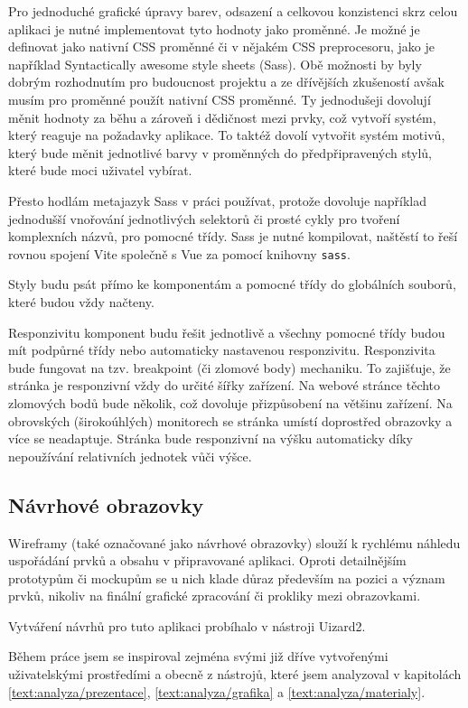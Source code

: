 Pro jednoduché grafické úpravy barev, odsazení a celkovou konzistenci skrz celou aplikaci je nutné implementovat tyto hodnoty jako proměnné.
Je možné je definovat jako nativní CSS proměnné či v nějakém CSS preprocesoru, jako je například Syntactically awesome style sheets (Sass).
Obě možnosti by byly dobrým rozhodnutím pro budoucnost projektu a ze dřívějších zkušeností avšak musím pro proměnné použít nativní CSS proměnné.
Ty jednodušeji dovolují měnit hodnoty za běhu a zároveň i dědičnost mezi prvky, což vytvoří systém, který reaguje na požadavky aplikace.
To taktéž dovolí vytvořit systém motivů, který bude měnit jednotlivé barvy v proměnných do předpřipravených stylů, které bude moci uživatel vybírat.

Přesto hodlám metajazyk Sass v práci používat, protože dovoluje například jednodušší vnořování jednotlivých selektorů či prosté cykly pro tvoření komplexních názvů, pro pomocné třídy.
Sass je nutné kompilovat, naštěstí to řeší rovnou spojení Vite společně s Vue za pomocí knihovny \texttt{sass}.

Styly budu psát přímo ke komponentám a pomocné třídy do globálních souborů, které budou vždy načteny.

Responzivitu komponent budu řešit jednotlivě a všechny pomocné třídy budou mít podpůrné třídy nebo automaticky nastavenou responzivitu.
Responzivita bude fungovat na tzv. breakpoint (či zlomové body) mechaniku.
To zajišťuje, že stránka je responzivní vždy do určité šířky zařízení.
Na webové stránce těchto zlomových bodů bude několik, což dovoluje přizpůsobení na většinu zařízení.
Na obrovských (širokoúhlých) monitorech se stránka umístí doprostřed obrazovky a více se neadaptuje.
Stránka bude responzivní na výšku automaticky díky nepoužívání relativních jednotek vůči výšce.

\subsection{Návrhové obrazovky}

Wireframy (také označované jako návrhové obrazovky) slouží k rychlému náhledu uspořádání prvků a obsahu v připravované aplikaci. 
Oproti detailnějším prototypům či mockupům se u nich klade důraz především na pozici a význam prvků, nikoliv na finální grafické zpracování či prokliky mezi obrazovkami.

Vytváření návrhů pro tuto aplikaci probíhalo v nástroji Uizard2. 

Během práce jsem se inspiroval zejména svými již dříve vytvořenými uživatelskými prostředími a obecně z nástrojů, které jsem analyzoval v kapitolách \ref{text:analyza/prezentace}, \ref{text:analyza/grafika} a \ref{text:analyza/materialy}.

